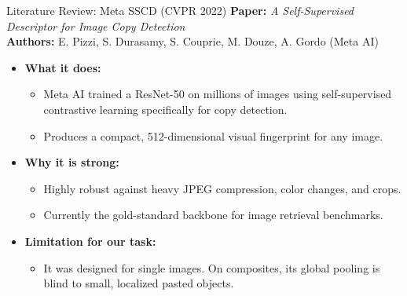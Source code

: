 \documentclass[xcolor=table]{beamer}
\begin{document}
\begin{frame}{Literature Review: Meta SSCD (CVPR 2022)}
  \textbf{Paper:} \textit{A Self-Supervised Descriptor for Image Copy Detection} \\
  \textbf{Authors:} E. Pizzi, S. Durasamy, S. Couprie, M. Douze, A. Gordo (Meta AI)
  \vspace{0.2cm}
  \begin{itemize}
    \item \textbf{What it does:} 
    \begin{itemize}
      \item Meta AI trained a ResNet-50 on millions of images using self-supervised contrastive learning specifically for copy detection.
      \item Produces a compact, 512-dimensional visual fingerprint for any image.
    \end{itemize}
    \item \textbf{Why it is strong:} 
    \begin{itemize}
      \item Highly robust against heavy JPEG compression, color changes, and crops.
      \item Currently the gold-standard backbone for image retrieval benchmarks.
    \end{itemize}
    \item \textbf{Limitation for our task:} 
    \begin{itemize}
      \item It was designed for single images. On composites, its global pooling is blind to small, localized pasted objects.
    \end{itemize}
  \end{itemize}
\end{frame}
\end{document}
